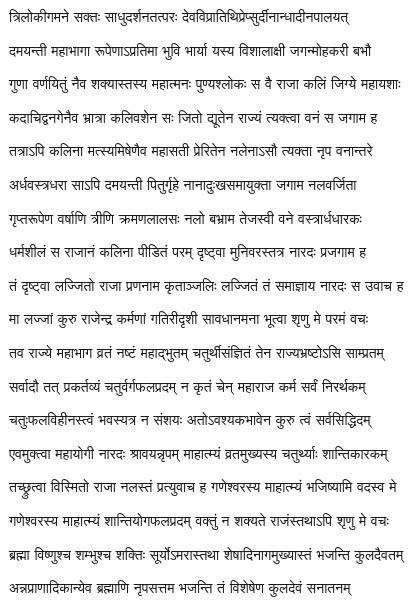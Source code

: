 \twolineshloka
{त्रिलोकीगमने सक्तः साधुदर्शनतत्परः}
{देवविप्रातिथिप्रेप्सुर्दीनान्धादीनपालयत्} %

\twolineshloka
{दमयन्ती महाभागा रूपेणाऽप्रतिमा भुवि}
{भार्या यस्य विशालाक्षी जगन्मोहकरी बभौ} %

\twolineshloka
{गुणा वर्णयितुं नैव शक्यास्तस्य महात्मनः}
{पुण्यश्लोकः स वै राजा कलिं जिग्ये महायशाः} %

\twolineshloka
{कदाचिद्वनगेनैव भ्रात्रा कलिवशेन सः}
{जितो द्यूतेन राज्यं त्यक्त्वा वनं स जगाम ह} %

\twolineshloka
{तत्राऽपि कलिना मत्स्यमिषेणैव महासती}
{प्रेरितेन नलेनाऽसौ त्यक्ता नृप वनान्तरे} %

\twolineshloka
{अर्धवस्त्रधरा साऽपि दमयन्ती पितुर्गृहे}
{नानादुःखसमायुक्ता जगाम नलवर्जिता} %

\twolineshloka
{गृप्तरूपेण वर्षाणि त्रीणि क्रमणलालसः}
{नलो बभ्राम तेजस्वी वने वस्त्रार्धधारकः} %

\twolineshloka
{धर्मशीलं स राजानं कलिना पीडितं परम्}
{दृष्ट्वा मुनिवरस्तत्र नारदः प्रजगाम ह} %

\twolineshloka
{तं दृष्ट्वा लज्जितो राजा प्रणनाम कृताञ्जलिः}
{लज्जितं तं समाज्ञाय नारदः स उवाच ह} %


\twolineshloka
{मा लज्जां कुरु राजेन्द्र कर्मणां गतिरीदृशी}
{सावधानमना भूत्वा श‍ृणु मे परमं वचः} %

\twolineshloka
{तव राज्ये महाभाग व्रतं नष्टं महाद्भुतम्}
{चतुर्थीसंज्ञितं तेन राज्यभ्रष्टोऽसि साम्प्रतम्} %

\twolineshloka
{सर्वादौ तत् प्रकर्तव्यं चतुर्वर्गफलप्रदम्}
{न कृतं चेन् महाराज कर्म सर्वं निरर्थकम्} %

\twolineshloka
{चतुःफलविहीनस्त्वं भवस्यत्र न संशयः}
{अतोऽवश्यकभावेन कुरु त्वं सर्वसिद्धिदम्} %

\twolineshloka
{एवमुक्त्वा महायोगी नारदः श्रावयन्नृपम्}
{माहात्म्यं व्रतमुख्यस्य चतुर्थ्याः शान्तिकारकम्} %

\twolineshloka
{तच्छ्रुत्वा विस्मितो राजा नलस्तं प्रत्युवाच ह}
{गणेश्वरस्य माहात्म्यं भजिष्यामि वदस्व मे} %


\twolineshloka
{गणेश्वरस्य माहात्म्यं शान्तियोगफलप्रदम्}
{वक्तुं न शक्यते राजंस्तथाऽपि श‍ृणु मे वचः} %

\twolineshloka
{ब्रह्मा विष्णुश्च शम्भुश्च शक्तिः सूर्योऽमरास्तथा}
{शेषादिनागमुख्यास्तं भजन्ति कुलदैवतम्} %

\twolineshloka
{अन्नप्राणादिकान्येव ब्रह्माणि नृपसत्तम}
{भजन्ति तं विशेषेण कुलदेवं सनातनम्} %

